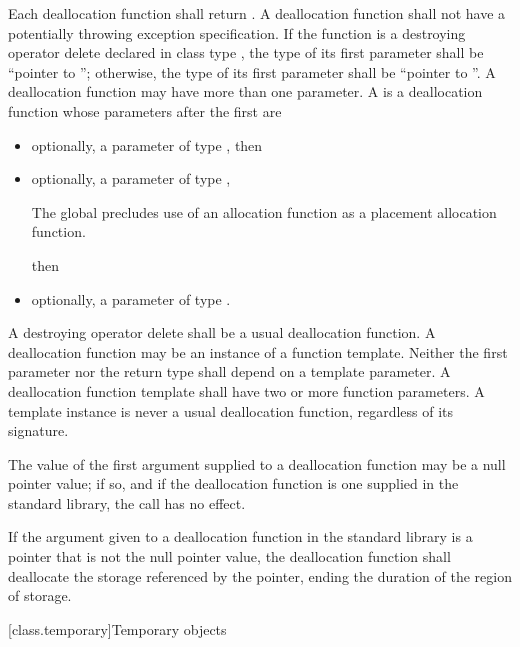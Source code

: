 \pnum
{}%
Each deallocation function shall return .
A deallocation function shall not have
a potentially throwing exception specification.
If the function is a destroying operator delete
declared in class type ,
the type of its first parameter shall be ``pointer to '';
otherwise, the type of its first
parameter shall be ``pointer to ''. A deallocation function may have more
than one parameter.
%
A  is a deallocation function
whose parameters after the first are
\begin{itemize}
\item
optionally, a parameter of type , then
\item
optionally, a parameter of type ,
\begin{footnote}
The global 
precludes use of an
allocation function  as a placement
allocation function.
\end{footnote}
then
\item
optionally, a parameter of type .
\end{itemize}
A destroying operator delete shall be a usual deallocation function.
A deallocation function may be an instance of a function
template. Neither the first parameter nor the return type shall depend
on a template parameter.
A deallocation
function template shall have two or more function parameters. A template
instance is never a usual deallocation function, regardless of its
signature.

\pnum
The value of the first argument supplied to a deallocation function may
be a null pointer value; if so, and if the deallocation function is one
supplied in the standard library, the call has no effect.

\pnum
If the argument given to a deallocation function in the standard library
is a pointer that is not the null pointer value, the
deallocation function shall deallocate the storage referenced by the
pointer, ending the duration of the region of storage.

[class.temporary]{Temporary objects}

